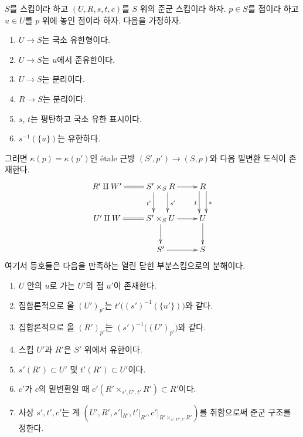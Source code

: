 \begin{lemma}
\label{lemma-quasi-finite-over-base}
$S$를 스킴이라 하고 $(U, R, s, t, c)$를 $S$ 위의 준군 스킴이라 하자.
$p \in S$를 점이라 하고 $u \in U$를 $p$ 위에 놓인 점이라 하자.
다음을 가정하자.
\begin{enumerate}
\item $U \to S$는 국소 유한형이다.
\item $U \to S$는 $u$에서 준유한이다.
\item $U \to S$는 분리이다.
\item $R \to S$는 분리이다.
\item $s$, $t$는 평탄하고 국소 유한 표시이다.
\item $s^{-1}(\{u\})$는 유한하다.
\end{enumerate}
그러면 $\kappa(p) = \kappa(p')$인 \'etale 근방
$(S', p') \to (S, p)$와 다음 밑변환 도식이 존재한다.
$$
\xymatrix{
R' \amalg W'
\ar@{=}[r] &
S' \times_S R
\ar[r] \ar@<2ex>[d]^{s'} \ar@<-2ex>[d]_{t'} &
R \ar@<1ex>[d]^s \ar@<-1ex>[d]_t \\
U' \amalg W
\ar@{=}[r] &
S' \times_S U
\ar[r] \ar[d] &
U \ar[d] \\
 &
S' \ar[r] &
S
}
$$
여기서 등호들은 다음을 만족하는 열린 닫힌 부분스킴으로의 분해이다.
\begin{enumerate}
\item[(a)] $U$ 안의 $u$로 가는 $U'$의 점 $u'$이 존재한다.
\item[(b)] 집합론적으로 올 $(U')_{p'}$는
$t'\big((s')^{-1}(\{u'\})\big)$와 같다.
\item[(c)] 집합론적으로 올 $(R')_{p'}$는
$(s')^{-1}\big((U')_{p'}\big)$와 같다.
\item[(d)] 스킴 $U'$과 $R'$은 $S'$ 위에서 유한이다.
\item[(e)] $s'(R') \subset U'$ 및 $t'(R') \subset U'$이다.
\item[(f)] $c'$가 $c$의 밑변환일 때
$c'(R' \times_{s', U', t'} R') \subset R'$이다.
\item[(g)] 사상 $s', t', c'$는 계
$(U', R', s'|_{R'}, t'|_{R'}, c'|_{R' \times_{s', U', t'} R'})$를
취함으로써 준군 구조를 정한다.
\end{enumerate}
\end{lemma}

